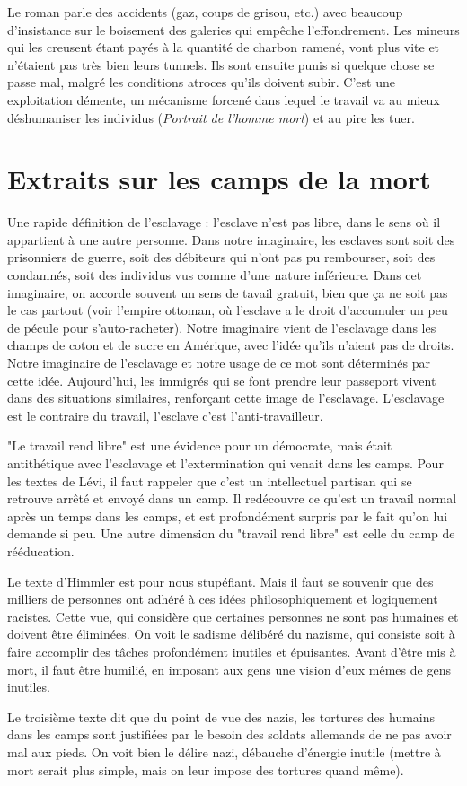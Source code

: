 \documentclass[a4paper,12pt]{book}
\begin{document}
\par Le roman parle des accidents (gaz, coups de grisou, etc.) avec beaucoup d'insistance sur le boisement des galeries qui empêche l'effondrement. Les mineurs qui les creusent étant payés à la quantité de charbon ramené, vont plus vite et n'étaient pas très bien leurs tunnels. Ils sont ensuite punis si quelque chose se passe mal, malgré les conditions atroces qu'ils doivent subir. C'est une exploitation démente, un mécanisme forcené dans lequel le travail va au mieux déshumaniser les individus (\textit{Portrait de l'homme mort}) et au pire les tuer.

\section{Extraits sur les camps de la mort}
Une rapide définition de l'esclavage : l'esclave n'est pas libre, dans le sens où il appartient à une autre personne. Dans notre imaginaire, les esclaves sont soit des prisonniers de guerre, soit des débiteurs qui n'ont pas pu rembourser, soit des condamnés, soit des individus vus comme d'une nature inférieure. Dans cet imaginaire, on accorde souvent un sens de tavail gratuit, bien que ça ne soit pas le cas partout (voir l'empire ottoman, où l'esclave a le droit d'accumuler un peu de pécule pour s'auto-racheter). Notre imaginaire vient de l'esclavage dans les champs de coton et de sucre en Amérique, avec l'idée qu'ils n'aient pas de droits. Notre imaginaire de l'esclavage et notre usage de ce mot sont déterminés par cette idée. Aujourd'hui, les immigrés qui se font prendre leur passeport vivent dans des situations similaires, renforçant cette image de l'esclavage. L'esclavage est le contraire du travail, l'esclave c'est l'anti-travailleur.
\par "Le travail rend libre" est une évidence pour un démocrate, mais était antithétique avec l'esclavage et l'extermination qui venait dans les camps. Pour les textes de Lévi, il faut rappeler que c'est un intellectuel partisan qui se retrouve arrêté et envoyé dans un camp. Il redécouvre ce qu'est un travail normal après un temps dans les camps, et est profondément surpris par le fait qu'on lui demande si peu. Une autre dimension du "travail rend libre" est celle du camp de rééducation.
\par Le texte d'Himmler est pour nous stupéfiant. Mais il faut se souvenir que des milliers de personnes ont adhéré à ces idées philosophiquement et logiquement racistes. Cette vue, qui considère que certaines personnes ne sont pas humaines et doivent être éliminées. On voit le sadisme délibéré du nazisme, qui consiste soit à faire accomplir des tâches profondément inutiles et épuisantes. Avant d'être mis à mort, il faut être humilié, en imposant aux gens une vision d'eux mêmes de gens inutiles.
\par Le troisième texte dit que du point de vue des nazis, les tortures des humains dans les camps sont justifiées par le besoin des soldats allemands de ne pas avoir mal aux pieds. On voit bien le délire nazi, débauche d'énergie inutile (mettre à mort serait plus simple, mais on leur impose des tortures quand même).
\end{document}
